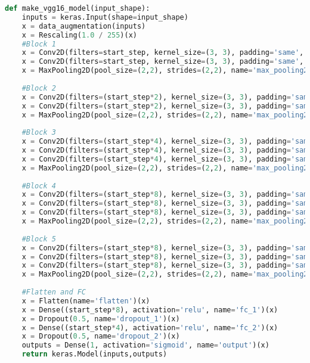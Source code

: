\begin{lstlisting}[language=Python]
	def make_vgg16_model(input_shape):
	inputs = keras.Input(shape=input_shape)
	x = data_augmentation(inputs)
	x = Rescaling(1.0 / 255)(x)
	#Block 1
	x = Conv2D(filters=start_step, kernel_size=(3, 3), padding='same', activation='relu', name='conv1_1')(x)
	x = Conv2D(filters=start_step, kernel_size=(3, 3), padding='same', activation='relu', name='conv1_2')(x)
	x = MaxPooling2D(pool_size=(2,2), strides=(2,2), name='max_pooling2d_1')(x)
	
	#Block 2
	x = Conv2D(filters=(start_step*2), kernel_size=(3, 3), padding='same', activation='relu', name='conv2_1')(x)
	x = Conv2D(filters=(start_step*2), kernel_size=(3, 3), padding='same', activation='relu', name='conv2_2')(x)
	x = MaxPooling2D(pool_size=(2,2), strides=(2,2), name='max_pooling2d_2')(x)
	
	#Block 3
	x = Conv2D(filters=(start_step*4), kernel_size=(3, 3), padding='same', activation='relu', name='conv3_1')(x)
	x = Conv2D(filters=(start_step*4), kernel_size=(3, 3), padding='same', activation='relu', name='conv3_2')(x)
	x = Conv2D(filters=(start_step*4), kernel_size=(3, 3), padding='same', activation='relu', name='conv3_3')(x)
	x = MaxPooling2D(pool_size=(2,2), strides=(2,2), name='max_pooling2d_3')(x)
	
	#Block 4
	x = Conv2D(filters=(start_step*8), kernel_size=(3, 3), padding='same', activation='relu', name='conv4_1')(x)
	x = Conv2D(filters=(start_step*8), kernel_size=(3, 3), padding='same', activation='relu', name='conv4_2')(x)
	x = Conv2D(filters=(start_step*8), kernel_size=(3, 3), padding='same', activation='relu', name='conv4_3')(x)
	x = MaxPooling2D(pool_size=(2,2), strides=(2,2), name='max_pooling2d_4')(x)
	
	#Block 5
	x = Conv2D(filters=(start_step*8), kernel_size=(3, 3), padding='same', activation='relu', name='conv5_1')(x)
	x = Conv2D(filters=(start_step*8), kernel_size=(3, 3), padding='same', activation='relu', name='conv5_2')(x)
	x = Conv2D(filters=(start_step*8), kernel_size=(3, 3), padding='same', activation='relu', name='conv5_3')(x)
	x = MaxPooling2D(pool_size=(2,2), strides=(2,2), name='max_pooling2d_5')(x)
	
	#Flatten and FC
	x = Flatten(name='flatten')(x)
	x = Dense((start_step*8), activation='relu', name='fc_1')(x)
	x = Dropout(0.5, name='dropout_1')(x)
	x = Dense((start_step*4), activation='relu', name='fc_2')(x)
	x = Dropout(0.5, name='dropout_2')(x)
	outputs = Dense(1, activation='sigmoid', name='output')(x)
	return keras.Model(inputs,outputs)			
\end{lstlisting}